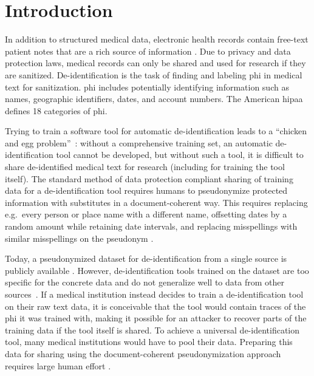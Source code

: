 

\section{Introduction}\label{sec:introduction}
%
In addition to structured medical data, electronic health records contain free-text patient notes that are a rich source of information \citep{jensen2012mining}.
%
Due to privacy and data protection laws, medical records can only be shared and used for research if they are sanitized.
%
De-identification is the task of finding and labeling \ac{phi} in medical text for sanitization.
%
\Ac{phi} includes potentially identifying information such as names, geographic identifiers, dates, and account numbers.
%
The American \ac{hipaa} defines 18 categories of \ac{phi}.




%
Trying to train a software tool for automatic de-identification leads to a ``chicken and egg problem''~\citep{uzuner2007evaluating}: without a comprehensive training set, an automatic de-identification tool cannot be developed, but without such a tool, it is difficult to share de-identified medical text for research (including for training the tool itself).
%
The standard method of data protection compliant sharing of training data for a de-identification tool requires humans to pseudonymize protected information with substitutes in a document-coherent way.
%
This requires replacing e.g.\ every person or place name with a different name, offsetting dates by a random amount while retaining date intervals, and replacing misspellings with similar misspellings on the pseudonym \cite{uzuner2007evaluating}.

%
Today, a pseudonymized dataset for de-identification from a single source is publicly available \citep{stubbs2015annotating}.
%
However, de-identification tools trained on the dataset are too specific for the concrete data and do not generalize well to data from other sources~\citep{stubbs2017identification}.
%
If a medical institution instead decides to train a de-identification tool on their raw text data, it is conceivable that the tool would contain traces of the \ac{phi} it was trained with, making it possible for an attacker to recover parts of the training data if the tool itself is shared.
%
To achieve a universal de-identification tool, many medical institutions would have to pool their data.
%
Preparing this data for sharing using the document-coherent pseudonymization approach requires large human effort \citep{dernoncourt2017identification}.

